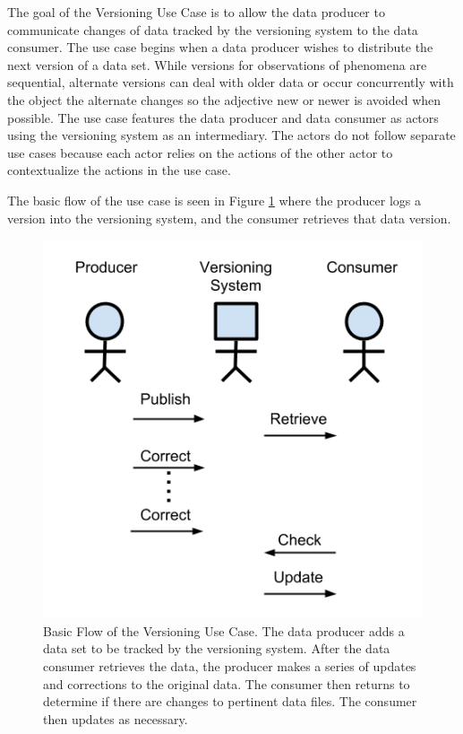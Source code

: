 The goal of the Versioning Use Case is to allow the data producer to communicate changes of data tracked by the versioning system to the data consumer.
The use case begins when a data producer wishes to distribute the next \gls{version} of a data set.
While \glspl{version} for observations of phenomena are sequential, alternate \glspl{version} can deal with older data or occur concurrently with the object the alternate changes so the adjective new or newer is avoided when possible.
The use case features the data producer and data consumer as actors using the versioning system as an intermediary.
The actors do not follow separate use cases because each actor relies on the actions of the other actor to contextualize the actions in the use case.

The basic flow of the use case is seen in Figure \ref{UCD1} where the producer logs a version into the versioning system, and the consumer retrieves that data version.
\begin{figure}
	\centering
	\includegraphics[scale=1]{figures/UC_Diagram1.png}
	\caption[Versioning Use Case Basic Flow]{Basic Flow of the Versioning Use Case.  The data producer adds a data set to be tracked by the versioning system.  After the data consumer retrieves the data, the producer makes a series of updates and corrections to the original data.  The consumer then returns to determine if there are changes to pertinent data files.  The consumer then updates as necessary.}
	\label{UCD1}
\end{figure}
